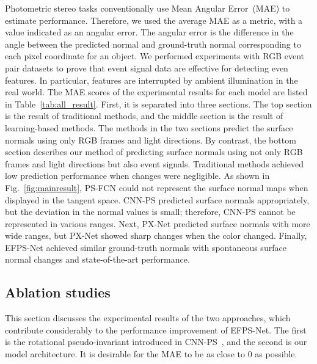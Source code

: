 \documentclass[preprint,12pt,authoryear]{elsarticle}
\begin{document}
Photometric stereo tasks conventionally use Mean Angular Error~(MAE) to estimate performance. Therefore, we used the average MAE as a metric, with a value indicated as an angular error. The angular error is the difference in the angle between the predicted normal and ground-truth normal corresponding to each pixel coordinate for an object. We performed experiments with RGB event pair datasets to prove that event signal data are effective for detecting even features. In particular, features are interrupted by ambient illumination in the real world. The MAE scores of the experimental results for each model are listed in Table~\ref{tab:all_result}. First, it is separated into three sections. The top section is the result of traditional methods, and the middle section is the result of learning-based methods. The methods in the two sections predict the surface normals using only RGB frames and light directions. By contrast, the bottom section describes our method of predicting surface normals using not only RGB frames and light directions but also event signals. Traditional methods achieved low prediction performance when changes were negligible. As shown in Fig.~\ref{fig:mainresult}, PS-FCN could not represent the surface normal maps when displayed in the tangent space. CNN-PS predicted surface normals appropriately, but the deviation in the normal values is small; therefore, CNN-PS cannot be represented in various ranges. Next, PX-Net predicted surface normals with more wide ranges, but PX-Net showed sharp changes when the color changed. Finally, EFPS-Net achieved similar ground-truth normals with spontaneous surface normal changes and state-of-the-art performance.

\subsection{Ablation studies}
This section discusses the experimental results of the two approaches, which contribute considerably to the performance improvement of EFPS-Net. The first is the rotational pseudo-invariant introduced in CNN-PS~\citep{ikehata2018cnn}, and the second is our model architecture. It is desirable for the MAE to be as close to 0 as possible.
\end{document}
